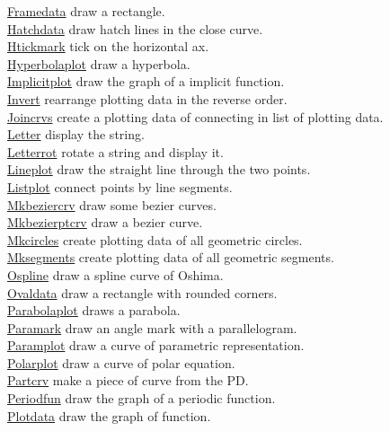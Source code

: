 \documentclass[papersize,a4paper,12pt]{article}
\begin{document}
\begin{tabbing}
\hyperlink{framedata}{Framedata} \> draw a rectangle.\\
\hyperlink{hatchdata}{Hatchdata} \> draw hatch lines in the close curve.\\
\hyperlink{htickmark}{Htickmark} \> tick on the horizontal ax.\\
\hyperlink{hyperbolaplot}{Hyperbolaplot} \> draw a hyperbola.\\
\hyperlink{implicitplot}{Implicitplot} \> draw the graph of a implicit function.\\
\hyperlink{invert}{Invert} \> rearrange plotting data in the reverse order.\\
\hyperlink{joincrvs}{Joincrvs} \> create a plotting data of connecting in list of plotting data.\\
\hyperlink{letter}{Letter} \> display the string.\\
\hyperlink{letterrot}{Letterrot} \> rotate a string and display it.\\
\hyperlink{lineplot}{Lineplot} \> draw the straight line through the two points.\\
\hyperlink{listplot}{Listplot} \> connect points by line segments.\\
\hyperlink{mkbeziercrv}{Mkbeziercrv} \> draw some bezier curves.\\
\hyperlink{mkbezierptcrv}{Mkbezierptcrv} \> draw a bezier curve.\\
\hyperlink{mkcircles}{Mkcircles} \> create plotting data of all geometric circles.\\
\hyperlink{mksegments}{Mksegments} \> create plotting data of all geometric segments.\\
\hyperlink{ospline}{Ospline} \> draw a spline curve of Oshima.\\
\hyperlink{ovaldata}{Ovaldata} \> draw a rectangle with rounded corners.\\
\hyperlink{parabolaplot}{Parabolaplot} \> draws a parabola.\\
\hyperlink{paramark}{Paramark} \> draw an angle mark with a parallelogram.\\
\hyperlink{paramplot}{Paramplot} \> draw a curve of parametric representation.\\
\hyperlink{polarplot}{Polarplot}\> draw a curve of polar equation.\\
\hyperlink{partcrv}{Partcrv} \> make a piece of curve from the PD.\\
\hyperlink{periodfun}{Periodfun} \> draw the graph of a periodic function.\\
\hyperlink{plotdata}{Plotdata} \> draw the graph of function.\\

\end{tabbing}
\end{document}
